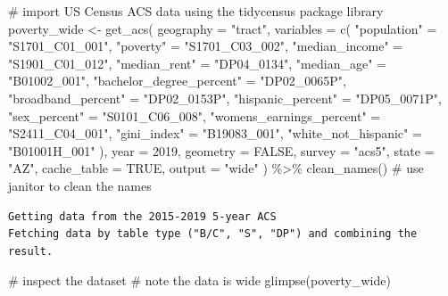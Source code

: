 \documentclass[
  letterpaper,
  DIV=11,
  numbers=noendperiod]{scrreprt}
\newenvironment{Shaded}{\begin{snugshade}}{\end{snugshade}}
\newcommand{\AttributeTok}[1]{\textcolor[rgb]{0.40,0.45,0.13}{#1}}
\newcommand{\CommentTok}[1]{\textcolor[rgb]{0.37,0.37,0.37}{#1}}
\newcommand{\ConstantTok}[1]{\textcolor[rgb]{0.56,0.35,0.01}{#1}}
\newcommand{\DecValTok}[1]{\textcolor[rgb]{0.68,0.00,0.00}{#1}}
\newcommand{\FunctionTok}[1]{\textcolor[rgb]{0.28,0.35,0.67}{#1}}
\newcommand{\NormalTok}[1]{\textcolor[rgb]{0.00,0.23,0.31}{#1}}
\newcommand{\OtherTok}[1]{\textcolor[rgb]{0.00,0.23,0.31}{#1}}
\newcommand{\SpecialCharTok}[1]{\textcolor[rgb]{0.37,0.37,0.37}{#1}}
\newcommand{\StringTok}[1]{\textcolor[rgb]{0.13,0.47,0.30}{#1}}
\begin{document}
\begin{Shaded}
\begin{Highlighting}[]
\CommentTok{\# import US Census ACS data using the tidycensus package library }
\NormalTok{poverty\_wide }\OtherTok{\textless{}{-}} \FunctionTok{get\_acs}\NormalTok{(}
  \AttributeTok{geography =} \StringTok{"tract"}\NormalTok{,}
  \AttributeTok{variables =} \FunctionTok{c}\NormalTok{(}
    \StringTok{"population"} \OtherTok{=} \StringTok{"S1701\_C01\_001"}\NormalTok{,}
    \StringTok{"poverty"} \OtherTok{=} \StringTok{"S1701\_C03\_002"}\NormalTok{,}
    \StringTok{"median\_income"} \OtherTok{=} \StringTok{"S1901\_C01\_012"}\NormalTok{,}
    \StringTok{"median\_rent"} \OtherTok{=} \StringTok{"DP04\_0134"}\NormalTok{,}
    \StringTok{"median\_age"} \OtherTok{=} \StringTok{"B01002\_001"}\NormalTok{,}
    \StringTok{"bachelor\_degree\_percent"} \OtherTok{=} \StringTok{"DP02\_0065P"}\NormalTok{,}
    \StringTok{"broadband\_percent"} \OtherTok{=} \StringTok{"DP02\_0153P"}\NormalTok{,}
    \StringTok{"hispanic\_percent"} \OtherTok{=} \StringTok{"DP05\_0071P"}\NormalTok{,}
    \StringTok{"sex\_percent"} \OtherTok{=} \StringTok{"S0101\_C06\_008"}\NormalTok{,}
    \StringTok{"womens\_earnings\_percent"} \OtherTok{=} \StringTok{"S2411\_C04\_001"}\NormalTok{,}
    \StringTok{"gini\_index"} \OtherTok{=} \StringTok{"B19083\_001"}\NormalTok{,}
    \StringTok{"white\_not\_hispanic"} \OtherTok{=} \StringTok{"B01001H\_001"}
\NormalTok{    ),}
  \AttributeTok{year =} \DecValTok{2019}\NormalTok{,}
  \AttributeTok{geometry =} \ConstantTok{FALSE}\NormalTok{,}
  \AttributeTok{survey =} \StringTok{"acs5"}\NormalTok{,}
  \AttributeTok{state =} \StringTok{"AZ"}\NormalTok{,}
  \AttributeTok{cache\_table =} \ConstantTok{TRUE}\NormalTok{,}
  \AttributeTok{output =} \StringTok{"wide"}
\NormalTok{) }\SpecialCharTok{\%\textgreater{}\%}
  \FunctionTok{clean\_names}\NormalTok{() }\CommentTok{\# use janitor to clean the names }
\end{Highlighting}
\end{Shaded}

\begin{verbatim}
Getting data from the 2015-2019 5-year ACS
Fetching data by table type ("B/C", "S", "DP") and combining the result.
\end{verbatim}

\begin{Shaded}
\begin{Highlighting}[]
\CommentTok{\# inspect the dataset}
\CommentTok{\# note the data is wide}
\FunctionTok{glimpse}\NormalTok{(poverty\_wide)}
\end{Highlighting}
\end{Shaded}
\end{document}
